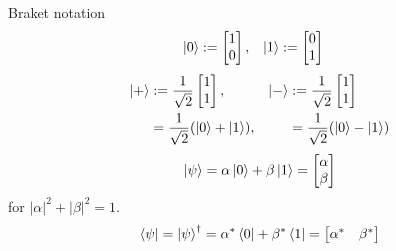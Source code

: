 \documentclass{beamer}
\begin{document}
\begin{frame}{Braket notation}
\begin{align*}
\ket{0} &:= \begin{bmatrix}1\\0\end{bmatrix},&
\ket{1} &:= \begin{bmatrix}0\\1\end{bmatrix}
\end{align*}
\begin{align*}
\ket{+} &:= \frac1{\sqrt{2}}\begin{bmatrix}1\\1\end{bmatrix},&
\ket{-} &:= \frac1{\sqrt{2}}\begin{bmatrix}1\\1\end{bmatrix}\\
&=\frac1{\sqrt{2}}(\ket{0}+\ket{1}),&
&=\frac1{\sqrt{2}}(\ket{0}-\ket{1})
\end{align*}
\begin{align*}
\ket{\psi} = \alpha\ket{0}+\beta\ket{1}=\begin{bmatrix}\alpha\\\beta\end{bmatrix}
\end{align*}
for $|\alpha|^2+|\beta|^2=1$.
\begin{align*}
\bra{\psi} = \ket{\psi}^\dagger = \alpha^*\bra{0}+\beta^*\bra{1}=\begin{bmatrix}\alpha^*&\beta^*\end{bmatrix}
\end{align*}
\end{frame}
\end{document}
